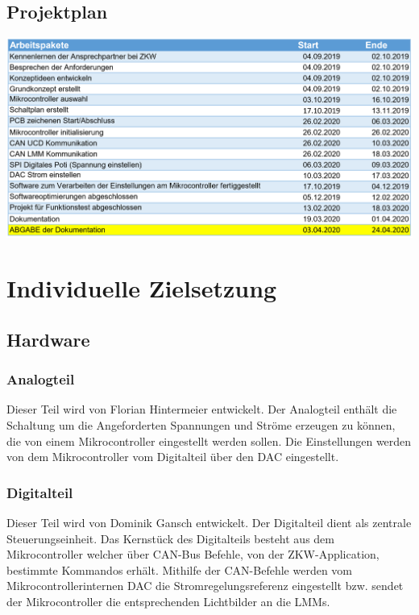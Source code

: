 \documentclass[paper=a4, 12pt]{scrreprt}
\begin{document}
	\section{Projektplan}
	\begin{adjustbox}{center,nofloat=figure,vspace=\bigskipamount}
		\includegraphics[width=\textwidth]{img/plan.PNG}
	\end{adjustbox}
	

\chapter{Individuelle Zielsetzung}
    \section{Hardware}    	
    	\subsection{Analogteil}
        Dieser Teil wird von Florian Hintermeier entwickelt. Der Analogteil enthält die Schaltung um die Angeforderten Spannungen und Ströme erzeugen zu können, die von einem Mikrocontroller eingestellt werden sollen. Die Einstellungen werden von dem Mikrocontroller vom Digitalteil über den DAC eingestellt.
        
        \subsection{Digitalteil}
        Dieser Teil wird von Dominik Gansch entwickelt. Der Digitalteil dient als zentrale Steuerungseinheit. Das Kernstück des Digitalteils besteht aus dem Mikrocontroller welcher über CAN-Bus Befehle, von der ZKW-Application, bestimmte Kommandos erhält. Mithilfe der  CAN-Befehle werden vom Mikrocontrollerinternen DAC die Stromregelungsreferenz eingestellt bzw. sendet der Mikrocontroller die entsprechenden Lichtbilder an die LMMs.%
\end{document}
